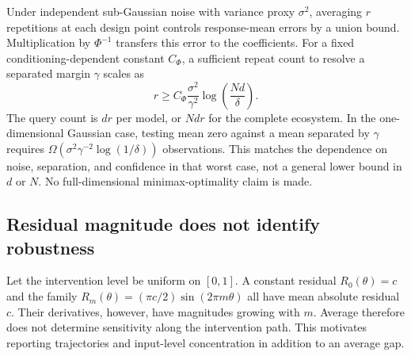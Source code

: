 Under independent sub-Gaussian noise with variance proxy $\sigma^2$, averaging $r$ repetitions at each design point controls response-mean errors by a union bound. Multiplication by $\Phi^{-1}$ transfers this error to the coefficients. For a fixed conditioning-dependent constant $C_\Phi$, a sufficient repeat count to resolve a separated margin $\gamma$ scales as
\begin{equation}
r\geq C_\Phi\frac{\sigma^2}{\gamma^2}\log\!\left(\frac{Nd}{\delta}\right).
\end{equation}
The query count is $dr$ per model, or $Ndr$ for the complete ecosystem. In the one-dimensional Gaussian case, testing mean zero against a mean separated by $\gamma$ requires $\Omega(\sigma^2\gamma^{-2}\log(1/\delta))$ observations. This matches the dependence on noise, separation, and confidence in that worst case, not a general lower bound in $d$ or $N$. No full-dimensional minimax-optimality claim is made.

\subsection{Residual magnitude does not identify robustness}
Let the intervention level be uniform on $[0,1]$. A constant residual $R_0(\theta)=c$ and the family $R_m(\theta)=(\pi c/2)\sin(2\pi m\theta)$ all have mean absolute residual $c$. Their derivatives, however, have magnitudes growing with $m$. Average \PIER therefore does not determine sensitivity along the intervention path. This motivates reporting trajectories and input-level concentration in addition to an average gap.

